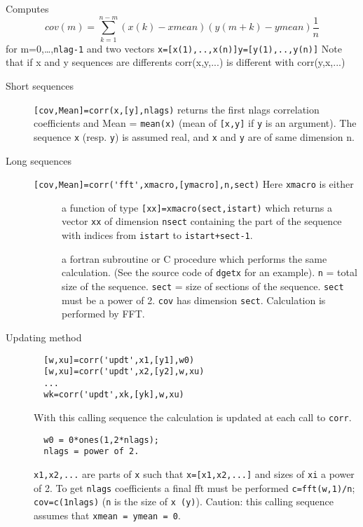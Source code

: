 \begin{mandescription}
  Computes
\[
   cov(m) = \sum_{k=1}^{n-m} 
   (x(k)  - xmean) (y(m+k)      - ymean) \frac{1}{n}
\]
for m=0,\ldots,\verb!nlag-1! and two vectors 
\verb!x=[x(1),..,x(n)]!\verb!y=[y(1),..,y(n)]!
Note that if x and y sequences are differents corr(x,y,...) is
different with corr(y,x,...)
\begin{description}
\item[Short sequences] \verb![cov,Mean]=corr(x,[y],nlags)! returns the first nlags
  correlation coefficients and Mean = \verb!mean(x)!
  (mean of \verb![x,y]! if \verb!y! is an argument).
  The sequence \verb!x! (resp. \verb!y!) is assumed real, and \verb!x! 
  and \verb!y! are of same dimension n.
\item[Long sequences] \verb![cov,Mean]=corr('fft',xmacro,[ymacro],n,sect)! Here \verb!xmacro! is either
  \begin{description}
  \item[]  
    a function of type \verb![xx]=xmacro(sect,istart)! which
    returns a vector \verb!xx! of dimension
    \verb!nsect! containing the part of the sequence with
    indices from \verb!istart! to
    \verb!istart+sect-1!.
  \item[] 
    a fortran subroutine or C procedure which performs the same
    calculation. (See the source code of \verb!dgetx! for an
    example). \verb!n! = total size of the
    sequence. \verb!sect! = size of sections of the
    sequence. \verb!sect! must be a power of
    2. \verb!cov! has dimension
    \verb!sect!. Calculation is performed by FFT. 
  \end{description}
\item[Updating method] 
\begin{verbatim}
  [w,xu]=corr('updt',x1,[y1],w0)
  [w,xu]=corr('updt',x2,[y2],w,xu)
  ...
  wk=corr('updt',xk,[yk],w,xu)
\end{verbatim}
With this calling sequence the calculation is updated at each
call to \verb!corr!.
\begin{verbatim}
  w0 = 0*ones(1,2*nlags);
  nlags = power of 2.
\end{verbatim}
\verb!x1,x2,...! are parts of \verb!x! such that
\verb!x=[x1,x2,...]! and sizes of \verb!xi! a power of
2.  To get \verb!nlags! coefficients a final fft must be
performed \verb!c=fft(w,1)/n!; \verb!cov=c(1nlags)!
(\verb!n! is the size of \verb!x (y)!).  Caution: this
calling sequence assumes that \verb!xmean = ymean = 0!. 
\end{description}
\end{mandescription}
